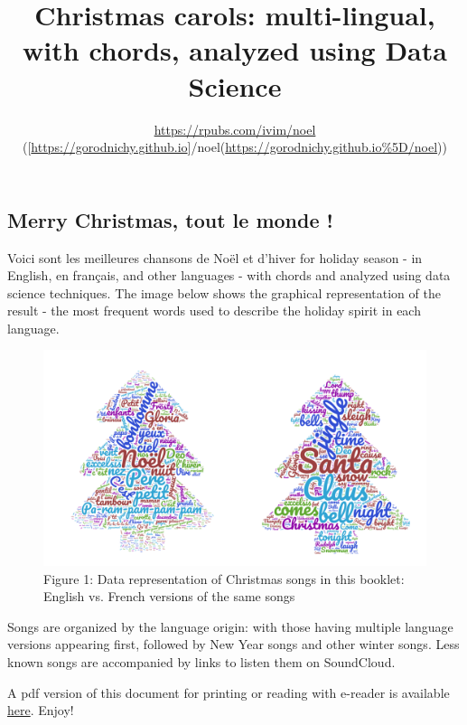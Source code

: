 \documentclass[
]{article}
\title{Christmas carols: multi-lingual, with chords, analyzed using Data
Science}
\author{}
\date{\vspace{-2.5em}\url{https://rpubs.com/ivim/noel}
({[}\url{https://gorodnichy.github.io}{]}/noel(\url{https://gorodnichy.github.io\%5D/noel}))}
\begin{document}
\maketitle

{
\setcounter{tocdepth}{4}
\tableofcontents
}
\hypertarget{merry-christmas-tout-le-monde}{%
\subsection*{Merry Christmas, tout le monde
!}\label{merry-christmas-tout-le-monde}}

Voici sont les meilleures chansons de Noël et d'hiver for holiday season
- in English, en français, and other languages - with chords and
analyzed using data science techniques. The image below shows the
graphical representation of the result - the most frequent words used to
describe the holiday spirit in each language.

\begin{figure}

{\centering \includegraphics[width=0.99\linewidth,height=0.2\textheight]{noel-songs-wordcloud} 

}

\caption{Figure 1: Data representation of Christmas songs in this booklet: 
English vs. French versions of the same songs }\label{fig:unnamed-chunk-2}
\end{figure}

Songs are organized by the language origin: with those having multiple
language versions appearing first, followed by New Year songs and other
winter songs. Less known songs are accompanied by links to listen them
on SoundCloud.

A pdf version of this document for printing or reading with e-reader is
available \href{https://ivi-m.github.io/noel/noel.pdf}{here}. Enjoy!
\end{document}
